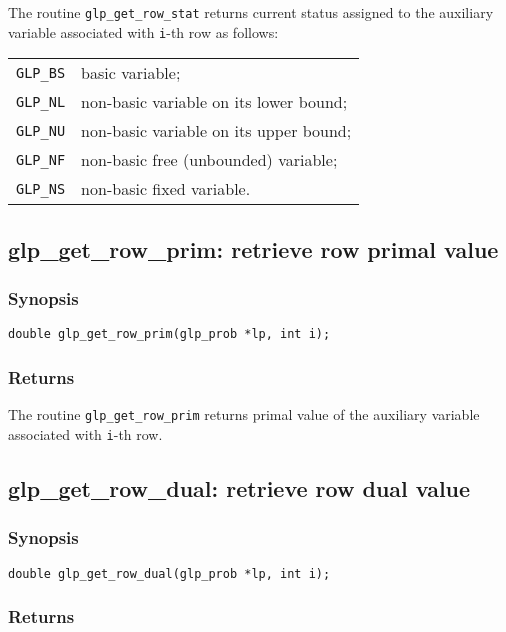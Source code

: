 The routine \verb|glp_get_row_stat| returns current status assigned to
the auxiliary variable associated with \verb|i|-th row as follows:

\begin{tabular}{@{}ll}
\verb|GLP_BS| & basic variable; \\
\verb|GLP_NL| & non-basic variable on its lower bound; \\
\verb|GLP_NU| & non-basic variable on its upper bound; \\
\verb|GLP_NF| & non-basic free (unbounded) variable; \\
\verb|GLP_NS| & non-basic fixed variable. \\
\end{tabular}

\subsection{glp\_get\_row\_prim: retrieve row primal value}

\subsubsection*{Synopsis}

\begin{verbatim}
double glp_get_row_prim(glp_prob *lp, int i);
\end{verbatim}

\subsubsection*{Returns}

The routine \verb|glp_get_row_prim| returns primal value of the
auxiliary variable associated with \verb|i|-th row.

\subsection{glp\_get\_row\_dual: retrieve row dual value}

\subsubsection*{Synopsis}

\begin{verbatim}
double glp_get_row_dual(glp_prob *lp, int i);
\end{verbatim}

\subsubsection*{Returns}


